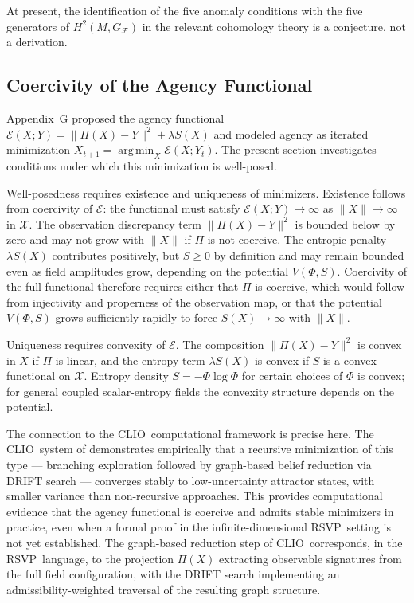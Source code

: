 \documentclass[12pt,a4paper]{article}
\DeclareMathOperator*{\argmin}{arg\,min}
\newcommand{\RSVP}{\textrm{RSVP}}
\newcommand{\CLIO}{\textrm{CLIO}}
\newcommand{\Field}{\mathcal{X}}
\begin{document}
At present, the identification of the five anomaly conditions with the five
generators of $H^2(M,G_\mathcal{F})$ in the relevant cohomology theory is a
conjecture, not a derivation.

\subsection{Coercivity of the Agency Functional}

Appendix~G proposed the agency functional
$\mathcal{E}(X;Y)=\|\Pi(X)-Y\|^2+\lambda S(X)$
and modeled agency as iterated minimization $X_{t+1}=\argmin_X\mathcal{E}(X;Y_t)$.
The present section investigates conditions under which this minimization is
well-posed.

Well-posedness requires existence and uniqueness of minimizers. Existence
follows from coercivity of $\mathcal{E}$: the functional must satisfy
$\mathcal{E}(X;Y)\to\infty$ as $\|X\|\to\infty$ in $\Field$. The observation
discrepancy term $\|\Pi(X)-Y\|^2$ is bounded below by zero and may not grow
with $\|X\|$ if $\Pi$ is not coercive. The entropic penalty $\lambda S(X)$
contributes positively, but $S\geq 0$ by definition and may remain bounded
even as field amplitudes grow, depending on the potential $V(\Phi,S)$. Coercivity
of the full functional therefore requires either that $\Pi$ is coercive, which
would follow from injectivity and properness of the observation map, or that
the potential $V(\Phi,S)$ grows sufficiently rapidly to force $S(X)\to\infty$
with $\|X\|$.

Uniqueness requires convexity of $\mathcal{E}$. The composition
$\|\Pi(X)-Y\|^2$ is convex in $X$ if $\Pi$ is linear, and the entropy term
$\lambda S(X)$ is convex if $S$ is a convex functional on $\Field$. Entropy
density $S=-\Phi\log\Phi$ for certain choices of $\Phi$ is convex; for general
coupled scalar-entropy fields the convexity structure depends on the potential.

The connection to the \CLIO\ computational framework is precise here. The
\CLIO\ system of \cite{Cheng2025} demonstrates empirically that a recursive
minimization of this type --- branching exploration followed by graph-based
belief reduction via DRIFT search --- converges stably to low-uncertainty
attractor states, with smaller variance than non-recursive approaches.
This provides computational evidence that the agency functional is coercive
and admits stable minimizers in practice, even when a formal proof in the
infinite-dimensional \RSVP\ setting is not yet established. The graph-based
reduction step of \CLIO\ corresponds, in the \RSVP\ language, to the
projection $\Pi(X)$ extracting observable signatures from the full field
configuration, with the DRIFT search implementing an admissibility-weighted
traversal of the resulting graph structure.
\end{document}
